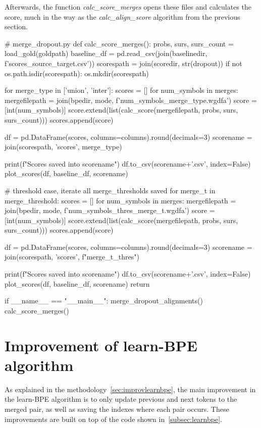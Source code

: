Afterwards, the function \emph{calc\_score\_merges} opens these files and calculates the score, much in the way as the \emph{calc\_align\_score} algorithm from the previous section.

\begin{python}
# merge_dropout.py
def calc_score_merges():
  probs, surs, surs_count = load_gold(goldpath)
  baseline_df = pd.read_csv(join(baselinedir, f'scores_{source}_{target}.csv'))
  scorespath = join(scoredir, str(dropout))
  if not os.path.isdir(scorespath):
    os.mkdir(scorespath)

  for merge_type in ['union', 'inter']:
    scores = []
    for num_symbols in merges:
      mergefilepath = join(bpedir, mode, f'{num_symbols}_{merge_type}.wgdfa')
      score = [int(num_symbols)]
      score.extend(list(calc_score(mergefilepath, probs, surs, surs_count)))
      scores.append(score)

    df = pd.DataFrame(scores, columns=columns).round(decimals=3)
    scorename = join(scorespath, 'scores', merge_type)

    print(f"Scores saved into {scorename}")
    df.to_csv(scorename+'.csv', index=False)
    plot_scores(df, baseline_df, scorename)

  # threshold case, iterate all merge_thresholds saved
  for merge_t in merge_threshold:
    scores = []
    for num_symbols in merges:
      mergefilepath = join(bpedir, mode, f'{num_symbols}_thres_{merge_t}.wgdfa')
      score = [int(num_symbols)]
      score.extend(list(calc_score(mergefilepath, probs, surs, surs_count)))
      scores.append(score)

    df = pd.DataFrame(scores, columns=columns).round(decimals=3)
    scorename = join(scorespath, 'scores', f"{merge_t}_thres")
    
    print(f"Scores saved into {scorename}")
    df.to_csv(scorename+'.csv', index=False)
    plot_scores(df, baseline_df, scorename)
  return

if __name__ == "__main__":
    merge_dropout_alignments()
    calc_score_merges()
\end{python}

\section{Improvement of learn-BPE algorithm}\label{dev:improvbpe}

As explained in the methodology~\ref{sec:improvlearnbpe}, the main improvement in the learn-BPE algorithm is to only update previous and next tokens to the merged pair, as well as saving the indexes where each pair occurs. These improvements are built on top of the code shown in~\ref{subsec:learnbpe}. 

